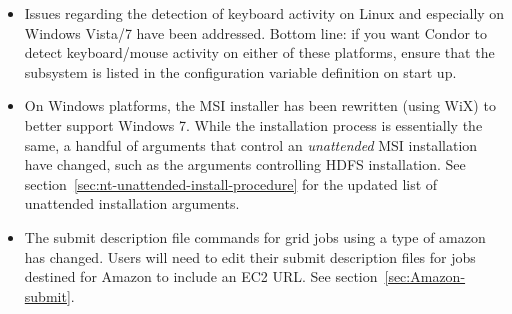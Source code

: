 \begin{itemize}
\item Issues regarding the detection of keyboard activity on Linux and
  especially on Windows Vista/7 have been addressed. Bottom line: if you
  want Condor to detect keyboard/mouse activity on either of these
  platforms, ensure that the subsystem  is listed in the
   configuration variable definition on start up.

\item On Windows platforms,
  the MSI installer has been rewritten (using WiX) to better
  support Windows 7. While the installation process is essentially the same,
  a handful of arguments that control an \emph{unattended} MSI installation
  have changed, such as the arguments controlling HDFS installation.  See
  section~\ref{sec:nt-unattended-install-procedure} for the updated list of
  unattended installation arguments.

\item The submit description file commands for grid jobs using a
 type of amazon has changed. Users will need to
edit their submit description files for jobs destined for Amazon to
include an EC2 URL. See section~\ref{sec:Amazon-submit}.

\end{itemize}

